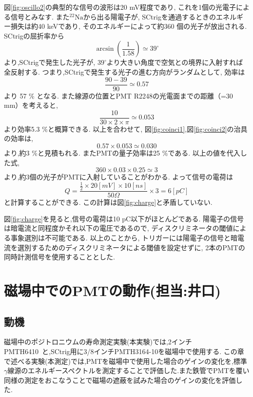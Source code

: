図\ref{fig:oscillo2}の典型的な信号の波形は20 mV程度であり,
これを1個の光電子による信号とみなす.
また$\mathrm{^{22}Na}$から出る陽電子が,
SCtrigを通過するときのエネルギー損失は約40 keVであり,
そのエネルギーによって約360 個の光子が放出される.
SCtrigの屈折率から
\begin{equation}
\arcsin(\frac{1}{1.58}) \simeq 39^{\circ}
\end{equation}
より,SCtrigで発生した光子が,
$39^{\circ}$より大きい角度で空気との境界に入射すれば全反射する.
つまり,SCtrigで発生する光子の進む方向がランダムとして,
効率は
\begin{equation}
\frac{90-39}{90} \simeq 0.57
\end{equation}
より 57 \% となる.
また線源の位置とPMT R2248の光電面までの距離（=30 mm）を考えると,
\begin{equation}
\frac{10}{30 \times 2 \times \pi} \simeq 0.053
\end{equation}
より効率5.3 \%と概算できる.
以上を合わせて,
図\ref{fig:coinci1},図\ref{fig:coinci2}の治具の効率は,
\begin{equation}
0.57 \times 0.053 \simeq 0.030
\end{equation}
より,約3 \%と見積もれる.
またPMTの量子効率は25 \%である.
以上の値を代入した式,
\begin{equation}
360 \times 0.03 \times 0.25 \simeq 3
\label{eq:pe}
\end{equation}
より,約3個の光子がPMTに入射していることがわかる.
よって信号の電荷は
\begin{equation}
	Q = \frac{\frac{1}{2} \times 20 [\si{mV}] \times 10[\si{ns}]}{50 \Omega} \times 3 = 6 [\si{pC}]
\label{eq:charge1}
\end{equation}
と計算することができる.
この計算は図\ref{fig:charge}と矛盾していない.

図\ref{fig:charge}を見ると,信号の電荷は10 pC以下がほとんどである.
陽電子の信号は暗電流と同程度かそれ以下の電圧であるので,
ディスクリミネータの閾値による事象選別は不可能である.
以上のことから,
トリガーには陽電子の信号と暗電流を選別するためのディスクリミネータによる閾値を設定せずに,
2本のPMTの同時計測信号を使用することとした.


\section{磁場中でのPMTの動作(担当:井口)}


\subsection{動機}
磁場中のポジトロニウムの寿命測定実験(本実験)では,2インチPMT\hspace{3pt}H6410~\cite{pmtH6410}と,SCtrig用に3/8インチPMT\hspace{3pt}H3164-10\cite{pmtH3164-10}を磁場中で使用する.
この章で述べる実験(本測定)では,PMTを磁場中で使用した場合のゲインの変化を,標準$\gamma$線源のエネルギースペクトルを測定することで評価した.また鉄管でPMTを覆い同様の測定をおこなうことで磁場の遮蔽を試みた場合のゲインの変化を評価した.


